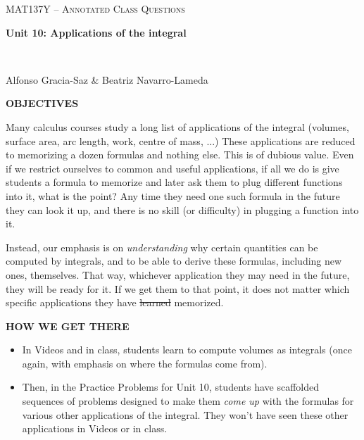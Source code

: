 \documentclass[11pt]{article}
\begin{document}
\thispagestyle{empty}
	\begin{center}
		{ {\LARGE  \scshape
		\textcolor{137cp3}{MAT137Y --   Annotated Class Questions}
		}
		
		\medskip
		{\bf \Large \textcolor{137cp1}{Unit 10: Applications of the integral
		}}
		
		\
		
		\medskip
		{\large
		\textcolor{137cp1}{Alfonso Gracia-Saz \& Beatriz Navarro-Lameda}
		}}
	\end{center}


{\bf OBJECTIVES}

\vspace{3mm}

Many calculus courses study a long list of applications of the integral (volumes, surface area, arc length, work, centre of mass, ...)  These applications are reduced to memorizing a dozen formulas and nothing else.   This is of dubious value.  Even if we restrict ourselves to common and useful applications, if all we do is give students a formula to memorize and later ask them to plug different functions into it, what is the point?    Any time they need one such formula in the future they can look it up, and there is no skill (or difficulty) in plugging a function into it.

\vspace{3mm}

Instead, our emphasis is on \emph{understanding} why certain quantities can be computed by integrals, and to be able to derive these formulas, including new ones, themselves.  That way, whichever application they may need in the future, they will be ready for it.   If we get them to that point, it does not matter which specific applications they have \sout{learned} memorized.

\vspace{5mm}

{\bf HOW WE GET THERE}


\begin{itemize}
	\item  In Videos and in class, students learn to compute volumes as integrals (once again, with emphasis on where the formulas come from).
	\item  Then, in the Practice Problems for Unit 10, students have scaffolded sequences of problems designed to make them \emph{come up} with the formulas for various other applications of the integral.   They won't have seen these other applications in Videos or in class.
\end{itemize}
\end{document}
